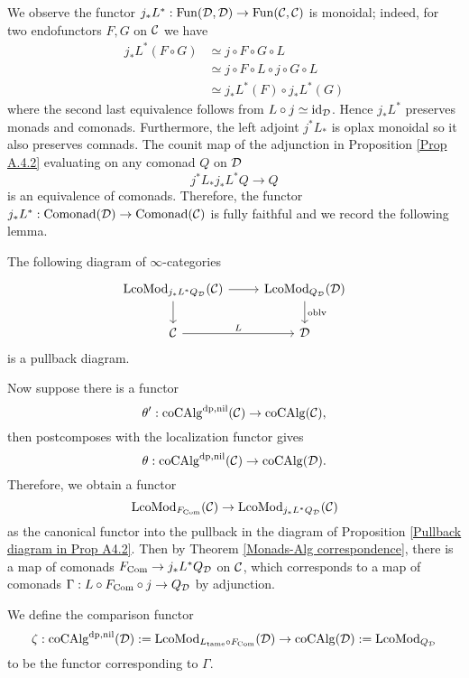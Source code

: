 We observe the functor $j_*L^*: \operatorname{Fun}({\mathcal{D}},{\mathcal{D}}) \to \operatorname{Fun}({\mathcal{C}},{\mathcal{C}})$ is monoidal; indeed, for two endofunctors $F,G$ on ${\mathcal{C}}$ we have
\begin{align*}
    j_*L^*(F\circ G) & \simeq j\circ F \circ G \circ L\\
                     & \simeq j\circ F \circ L \circ j \circ  G \circ L \\
                     & \simeq j_*L^*(F)\circ j_*L^*(G)
\end{align*}
where the second last equivalence follows from $ L \circ j \simeq \operatorname{id}_{{\mathcal{D}}}$.
Hence $j_*L^*$ preserves monads and comonads. Furthermore, the left adjoint $j^*L_*$ is oplax monoidal so it also preserves comnads. 
The counit map of the adjunction in Proposition \ref{Prop A.4.2} evaluating on any comonad $Q$ on ${\mathcal{D}}$
$$
j^*L_*j_*L^*Q  \to  Q
$$
is an equivalence of comonads. Therefore, the functor $j_*L^*:\operatorname{Comonad}({\mathcal{D}}) \to \operatorname{Comonad}({\mathcal{C}})$ is fully faithful and we record the following lemma.

\begin{lemma}
\label{Pullback diagram in Prop A4.2}
The following diagram of $\infty$-categories
\[
\begin{tikzcd}
	\LcoMod_{j_*L^*Q_\CD}(\CC) & \LcoMod_{Q_\CD}(\CD)\\
    \CC & \CD
	\arrow[from=1-1, to= 1-2]
	\arrow[from=1-1, to=2-1]
	\arrow[from=1-2, to=2-2, "\oblv"]
	\arrow[from=2-1, to= 2-2, "L"]
\end{tikzcd}
\]
is a pullback diagram.
\end{lemma}

Now suppose there is a functor
$$
\theta': \operatorname{coCAlg}^{\operatorname{dp}, \operatorname{nil}}({\mathcal{C}}) \to \operatorname{coCAlg}({\mathcal{C}}),
$$
then postcomposes with the localization functor gives
$$
\theta: \operatorname{coCAlg}^{\operatorname{dp}, \operatorname{nil}}({\mathcal{C}}) \to \operatorname{coCAlg}({\mathcal{D}}).
$$
Therefore, we obtain a functor 
$$
\operatorname{LcoMod}_{F_{\operatorname{Com}}}({\mathcal{C}}) \to
\operatorname{LcoMod}_{j_*L^*Q_{\mathcal{D}}}({\mathcal{C}})
$$
as the canonical functor into the pullback in the diagram of Proposition \ref{Pullback diagram in Prop A4.2}. 
Then by Theorem \ref{Monads-Alg correspondence}, there is a map of comonads
$F_{\operatorname{Com}}\to j_*L^*Q_{\mathcal{D}}$ on ${\mathcal{C}}$, which corresponds to a map of comonads 
$\Gamma:L\circ F_{\operatorname{Com}}\circ j \to Q_{{\mathcal{D}}}$ by adjunction.
\begin{definition}
    We define the comparison functor
    \[
    \zeta: \operatorname{coCAlg}^{\operatorname{dp},\operatorname{nil}}({\mathcal{D}}) :=\operatorname{LcoMod}_{L_{\operatorname{\operatorname{tame}}}\circ F_{\operatorname{Com}}}({\mathcal{D}}) \to \operatorname{coCAlg}({\mathcal{D}}):=\operatorname{LcoMod}_{Q_{{\mathcal{D}}}}
    \]
    to be the functor corresponding to $\Gamma$.
\end{definition}

